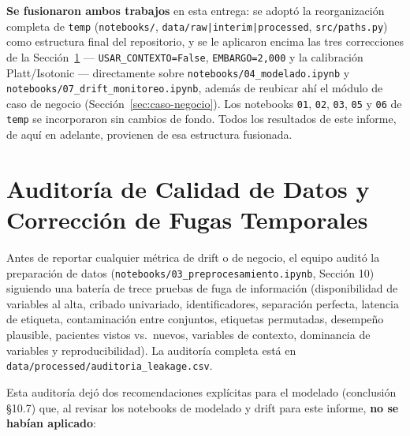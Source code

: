 \documentclass[11pt,a4paper]{article}
\newcommand{\nb}[1]{\texttt{notebooks/}\allowbreak\texttt{#1}}
\begin{document}
\textbf{Se fusionaron ambos trabajos} en esta entrega: se adoptó la reorganización completa de \texttt{temp} (\nb{}, \texttt{data/raw|interim|processed}, \texttt{src/paths.py}) como estructura final del repositorio, y se le aplicaron encima las tres correcciones de la Sección~\ref{sec:auditoria-drift} --- \texttt{USAR\_CONTEXTO=False}, \texttt{EMBARGO=2{,}000} y la calibración Platt/Isotonic --- directamente sobre \nb{04\_modelado.ipynb} y \nb{07\_drift\_monitoreo.ipynb}, además de reubicar ahí el módulo de caso de negocio (Sección~\ref{sec:caso-negocio}). Los notebooks \texttt{01}, \texttt{02}, \texttt{03}, \texttt{05} y \texttt{06} de \texttt{temp} se incorporaron sin cambios de fondo. Todos los resultados de este informe, de aquí en adelante, provienen de esa estructura fusionada.

\section{Auditoría de Calidad de Datos y Corrección de Fugas Temporales}
\label{sec:auditoria-drift}

Antes de reportar cualquier métrica de drift o de negocio, el equipo auditó la preparación de datos (\nb{03\_preprocesamiento.ipynb}, Sección 10) siguiendo una batería de trece pruebas de fuga de información (disponibilidad de variables al alta, cribado univariado, identificadores, separación perfecta, latencia de etiqueta, contaminación entre conjuntos, etiquetas permutadas, desempeño plausible, pacientes vistos vs.\ nuevos, variables de contexto, dominancia de variables y reproducibilidad). La auditoría completa está en \texttt{data/processed/auditoria\_leakage.csv}.

Esta auditoría dejó dos recomendaciones explícitas para el modelado (conclusión \S10.7) que, al revisar los notebooks de modelado y drift para este informe, \textbf{no se habían aplicado}:
\end{document}
